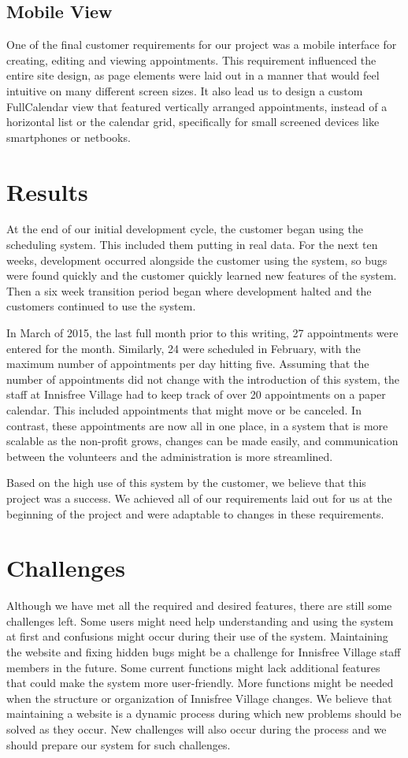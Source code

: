 \documentclass{sig-alternate}
\begin{document}
\subsection{Mobile View}
One of the final customer requirements for our project was a mobile interface for creating, editing and viewing appointments. This requirement influenced the entire site design, as page elements were laid out in a manner that would feel intuitive on many different screen sizes. It also lead us to design a custom FullCalendar view that featured vertically arranged appointments, instead of a horizontal list or the calendar grid, specifically for small screened devices like smartphones or netbooks.

\section{Results}
At the end of our initial development cycle, the customer began using the scheduling system.  This included them putting in real data.  For the next ten weeks, development occurred alongside the customer using the system, so bugs were found quickly and the customer quickly learned new features of the system.  Then a six week transition period began where development halted and the customers continued to use the system.

In March of 2015, the last full month prior to this writing, 27 appointments were entered for the month.  Similarly, 24 were scheduled in February, with the maximum number of appointments per day hitting five.  Assuming that the number of appointments did not change with the introduction of this system, the staff at Innisfree Village had to keep track of over 20 appointments on a paper calendar.  This included appointments that might move or be canceled.  In contrast, these appointments are now all in one place, in a system that is more scalable as the non-profit grows, changes can be made easily, and communication between the volunteers and the administration is more streamlined.

Based on the high use of this system by the customer, we believe that this project was a success.  We achieved all of our requirements laid out for us at the beginning of the project and were adaptable to changes in these requirements.

\section{Challenges}
Although we have met all the required and desired features, there are still some challenges left. Some users might need help understanding and using the system at first and confusions might occur during their use of the system. Maintaining the website and fixing hidden bugs might be a challenge for Innisfree Village staff members in the future. Some current functions might lack additional features that could make the system more user-friendly. More functions might be needed when the structure or organization of Innisfree Village changes. We believe that maintaining a website is a dynamic process during which new problems should be solved as they occur. New challenges will also occur during the process and we should prepare our system for such challenges.
\end{document}
